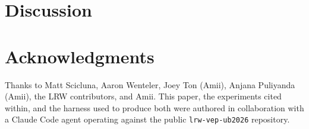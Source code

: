 \documentclass{article}
\begin{document}
\section{Discussion}
\label{sec:discussion}


\section*{Acknowledgments}

Thanks to Matt Scicluna, Aaron Wenteler, Joey Ton (Amii), Anjana Puliyanda
(Amii), the LRW contributors, and Amii. This paper, the experiments cited
within, and the harness used to produce both were authored in collaboration
with a Claude Code agent operating against the public
\texttt{lrw-vep-ub2026} repository.



\end{document}

